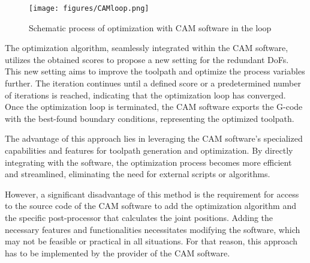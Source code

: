  \begin{figure}[H]
 	\centerline{\texttt{[image: figures/CAMloop.png]}}
 	\caption{Schematic process of optimization with CAM software in the loop}
 	\label{CAMloop}
 \end{figure}



The optimization algorithm, seamlessly integrated within the \acrshort{CAM} software, utilizes the obtained scores to propose a new setting for the redundant \acrshort{DoF}s. This new setting aims to improve the toolpath and optimize the process variables further. The iteration continues until a defined score or a predetermined number of iterations is reached, indicating that the optimization loop has converged.
Once the optimization loop is terminated, the \acrshort{CAM} software exports the G-code with the best-found boundary conditions, representing the optimized toolpath.

The advantage of this approach lies in leveraging the \acrshort{CAM} software's specialized capabilities and features for toolpath generation and optimization. By directly integrating with the software, the optimization process becomes more efficient and streamlined, eliminating the need for external scripts or algorithms.

However, a significant disadvantage of this method is the requirement for access to the source code of the \acrshort{CAM} software to add the optimization algorithm and the specific post-processor that calculates the joint positions. Adding the necessary features and functionalities necessitates modifying the software, which may not be feasible or practical in all situations. For that reason, this approach has to be implemented by the provider of the \acrshort{CAM} software. 